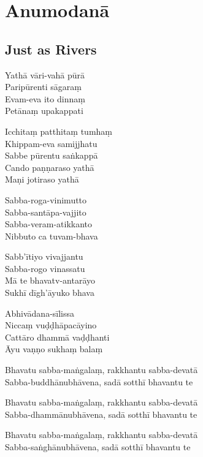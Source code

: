 \chapter{Anumodanā}

\section{Just as Rivers}


\begin{paritta}

%
Yathā vāri-vahā pūrā\\
Paripūrenti sāgaraṃ\\
Evam-eva ito dinnaṃ\\
Petānaṃ upakappati\hfill {}

Icchitaṃ patthitaṃ tumhaṃ\\
Khippam-eva samijjhatu\\
Sabbe pūrentu saṅkappā\\
Cando paṇṇaraso yathā\\
Maṇi jotiraso yathā\hfill {}

%
Sabba-roga-vinimutto\\
Sabba-santāpa-vajjito\\
Sabba-veram-atikkanto\\
Nibbuto ca tuvam-bhava

Sabb'ītiyo vivajjantu\\
Sabba-rogo vinassatu\\
Mā te bhavatv-antarāyo\\
Sukhī dīgh'āyuko bhava

Abhivādana-sīlissa\\
Niccaṃ vuḍḍhāpacāyino\\
Cattāro dhammā vaḍḍhanti\\
Āyu vaṇṇo sukhaṃ balaṃ\hfill {}

Bhavatu sabba-maṅgalaṃ, rakkhantu sabba-devatā\\
Sabba-buddhānubhāvena, sadā sotthī bhavantu te

Bhavatu sabba-maṅgalaṃ, rakkhantu sabba-devatā\\
Sabba-dhammānubhāvena, sadā sotthī bhavantu te

Bhavatu sabba-maṅgalaṃ, rakkhantu sabba-devatā\\
Sabba-saṅghānubhāvena, sadā sotthī bhavantu te

\end{paritta}

